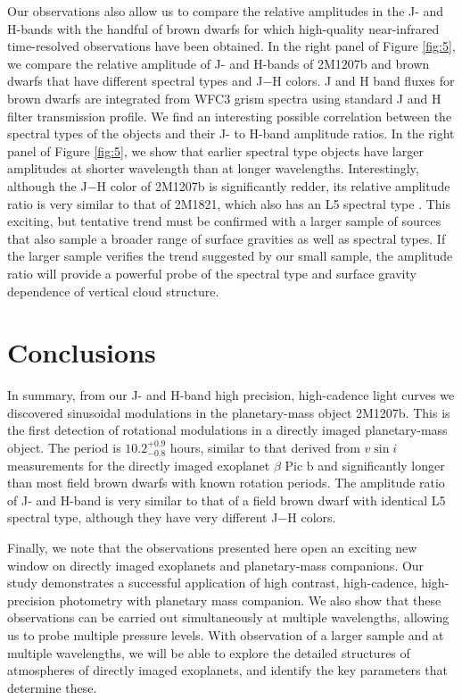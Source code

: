 \documentclass[apj]{emulateapj}
\newcommand{\bpic}{$\beta$ Pic}
\newcommand{\vsini}{$v\sin i$}
\begin{document}
Our observations also allow us to compare the relative amplitudes in
the J- and H-bands with the handful of brown dwarfs for which
high-quality near-infrared time-resolved observations have been
obtained. In the right panel of Figure \ref{fig:5}, we compare the
relative amplitude of J- and H-bands of 2M1207b and brown dwarfs
\citep{Apai2013,Buenzli2012,Buenzli2015,Yang2015} that have different
spectral types and J$-$H colors.  J and H band fluxes for brown dwarfs
are integrated from WFC3 grism spectra using standard J and H filter
transmission profile. We find an interesting possible correlation
between the spectral types of the objects and their J- to H-band
amplitude ratios. In the right panel of Figure \ref{fig:5}, we show
that earlier spectral type objects have larger amplitudes at shorter
wavelength than at longer wavelengths. Interestingly, although the
J$-$H color of 2M1207b is significantly redder, its relative amplitude
ratio is very similar to that of 2M1821, which also has an L5 spectral
type \citep{Yang2015}.  This exciting, but tentative trend must be
confirmed with a larger sample of sources that also sample a broader
range of surface gravities as well as spectral types.  If the larger
sample verifies the trend suggested by our small sample, the amplitude
ratio will provide a powerful probe of the spectral type and surface
gravity dependence of vertical cloud structure.



\section{Conclusions}
In summary, from our J- and H-band high precision, high-cadence light
curves we discovered sinusoidal modulations in the planetary-mass
object 2M1207b. This is the first detection of rotational modulations
in a directly imaged planetary-mass object.  The period is
$10.2^{+0.9}_{-0.8}$ hours, similar to that derived from \vsini{} 
measurements for the directly imaged exoplanet \bpic{} b and
significantly longer than most field brown dwarfs with known rotation
periods. The amplitude ratio of J- and H-band is very
similar to that of a field brown dwarf with identical L5 spectral type, although they have
very different J$-$H colors.

Finally, we note that the observations presented here open an exciting
new window on directly imaged exoplanets and planetary-mass
companions. Our study demonstrates a successful application of
high contrast, high-cadence, high-precision photometry with planetary
mass companion. We also show that these observations can be carried
out simultaneously at multiple wavelengths, allowing us to probe
multiple pressure levels. With observation of a larger sample and at
multiple wavelengths, we will be able to explore the detailed
structures of atmospheres of directly imaged exoplanets, and identify
the key parameters that determine these.
\end{document}
